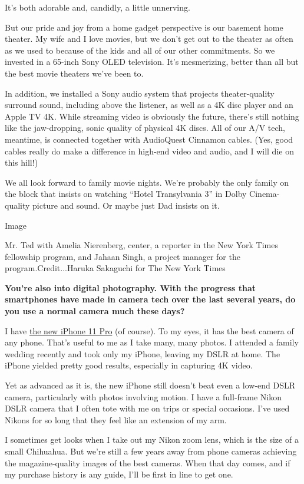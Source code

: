 It's both adorable and, candidly, a little unnerving.

But our pride and joy from a home gadget perspective is our basement
home theater. My wife and I love movies, but we don't get out to the
theater as often as we used to because of the kids and all of our other
commitments. So we invested in a 65-inch Sony OLED television. It's
mesmerizing, better than all but the best movie theaters we've been to.

In addition, we installed a Sony audio system that projects
theater-quality surround sound, including above the listener, as well as
a 4K disc player and an Apple TV 4K. While streaming video is obviously
the future, there's still nothing like the jaw-dropping, sonic quality
of physical 4K discs. All of our A/V tech, meantime, is connected
together with AudioQuest Cinnamon cables. (Yes, good cables really do
make a difference in high-end video and audio, and I will die on this
hill!)

We all look forward to family movie nights. We're probably the only
family on the block that insists on watching ``Hotel Transylvania 3'' in
Dolby Cinema-quality picture and sound. Or maybe just Dad insists on it.

Image

Mr. Ted with Amelia Nierenberg, center, a reporter in the New York Times
fellowship program, and Jahaan Singh, a project manager for the
program.Credit...Haruka Sakaguchi for The New York Times

\textbf{You're also into digital photography. With the progress that
smartphones have made in camera tech over the last several years, do you
use a normal camera much these days?}

I have
\href{https://www.nytimes3xbfgragh.onion/2019/09/17/technology/personaltech/iphone-11-review.html}{the
new iPhone 11 Pro} (of course). To my eyes, it has the best camera of
any phone. That's useful to me as I take many, many photos. I attended a
family wedding recently and took only my iPhone, leaving my DSLR at
home. The iPhone yielded pretty good results, especially in capturing 4K
video.

Yet as advanced as it is, the new iPhone still doesn't beat even a
low-end DSLR camera, particularly with photos involving motion. I have a
full-frame Nikon DSLR camera that I often tote with me on trips or
special occasions. I've used Nikons for so long that they feel like an
extension of my arm.

I sometimes get looks when I take out my Nikon zoom lens, which is the
size of a small Chihuahua. But we're still a few years away from phone
cameras achieving the magazine-quality images of the best cameras. When
that day comes, and if my purchase history is any guide, I'll be first
in line to get one.

